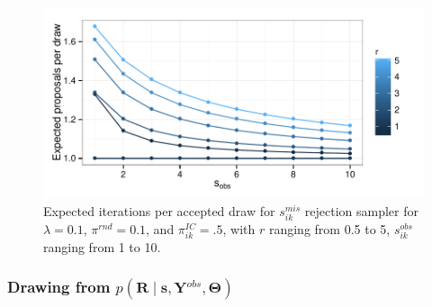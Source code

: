\begin{figure}
\begin{center}
\includegraphics[width=.75\textwidth]{figures/proteomics/figure_nstates_sampler}
\end{center}
\caption{Expected iterations per accepted draw for $s_{ik}^{mis}$ rejection sampler for $\lambda=0.1$, $\pi^{rnd}=0.1$, and $\pi_{ik}^{IC}=.5$, with $r$ ranging from 0.5 to 5, $s_{ik}^{obs}$ ranging from 1 to 10. \label{proteomics:fig:s_ik^mis-Rejection-Sampler}}
\end{figure}


\subsubsection{Drawing from $p(\bm{R} \mid \bm s, \bm{Y}^{obs}, \bm{\Theta})$} \label{proteomics:sec:r_ik_mis_post}

